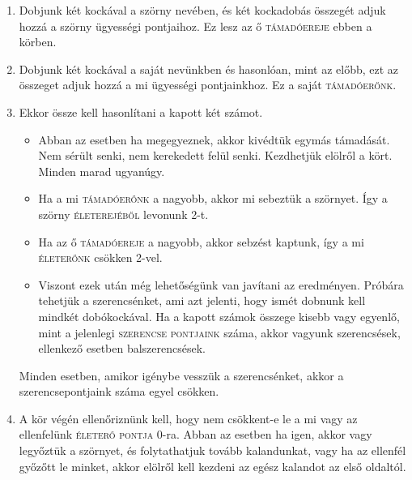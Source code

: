 \documentclass[12pt,a4paper,oneside]{report}
\newcommand{\stat}{\textsc}
\begin{document}
        \begin{enumerate}
          \item Dobjunk két kockával a szörny nevében, és két kockadobás összegét adjuk
            hozzá a szörny ügyességi pontjaihoz. Ez lesz az ő \textsc{támadóereje} ebben a körben.
          \item Dobjunk két kockával a saját nevünkben és hasonlóan, mint az előbb,
            ezt az összeget adjuk hozzá a mi ügyességi pontjainkhoz. Ez a saját
            \textsc{támadóerőnk}.
          \item Ekkor össze kell hasonlítani a kapott két számot.
            \begin{itemize}
              \item Abban az esetben ha megegyeznek, akkor kivédtük egymás
                támadását. Nem sérült senki, nem kerekedett felül senki. Kezdhetjük
                elölről a kört. Minden marad ugyanúgy.
              \item Ha a mi \textsc{támadóerőnk} a nagyobb, akkor mi sebeztük a szörnyet. Így a
                szörny \stat{életerejéből} levonunk 2-t.
              \item Ha az ő \textsc{támadóereje} a nagyobb, akkor sebzést kaptunk, így a mi
                \stat{életerőnk} csökken 2-vel.
              \item Viszont ezek után még lehetőségünk van javítani az
                eredményen. Próbára tehetjük a szerencsénket, ami azt jelenti, hogy
                ismét dobnunk kell mindkét dobókockával. Ha a kapott számok összege
                kisebb vagy egyenlő, mint a jelenlegi \stat{szerencse pontjaink} száma,
                akkor vagyunk szerencsések, ellenkező esetben
                balszerencsések.
            \end{itemize}
            Minden esetben, amikor igénybe vesszük a
            szerencsénket, akkor a szerencsepontjaink száma egyel csökken.
          \item A kör végén ellenőriznünk kell, hogy nem csökkent-e le a mi vagy az
            ellenfelünk \stat{életerő pontja} 0-ra. Abban az esetben ha igen, akkor vagy
            legyőztük a szörnyet, és folytathatjuk tovább kalandunkat, vagy ha
            az ellenfél győzőtt le minket, akkor elölről kell kezdeni az egész
            kalandot az első oldaltól.
        \end{enumerate} 
\end{document}
